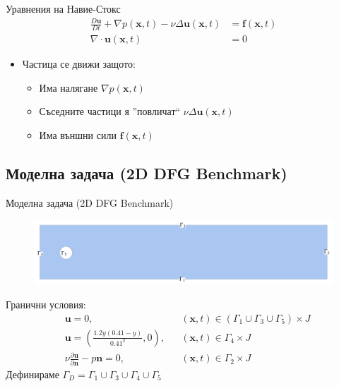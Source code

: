 \documentclass{beamer}
\newcommand{\vecf}[1]{\boldsymbol{#1}}
\begin{document}
\begin{frame}{Уравнения на Навие-Стокс}
\begin{align*}
  \frac{D\boldsymbol{u}}{Dt} + \nabla p(\vecf{x}, t) - \nu\Delta\vecf{u}(\vecf{x}, t) &= \vecf{f}(\vecf{x}, t)\\
  \nabla \cdot \vecf{u}(\vecf{x}, t) &= 0
\end{align*}
	\begin{itemize}[<+->]
		\item Частица се движи защото:
			\begin{itemize}
				\item Има налягане $\nabla p(\vecf{x}, t)$
				\item Съседните частици я ''повличат`` $\nu\Delta\vecf{u}(\vecf{x}, t)$
				\item Има външни сили $\vecf{f}(\vecf{x}, t)$
			\end{itemize}
	\end{itemize}
\end{frame}

\subsection{Моделна задача (2D DFG Benchmark)}
\begin{frame}{Моделна задача (2D DFG Benchmark)}
\begin{figure}[H]
  \centering
  \includegraphics[width=\textwidth]{../../Figures/02_model_problem/2D_DFG_Benchmark.pdf}
\end{figure}
Гранични условия:
\begin{align*}
  &\vecf{u} = 0, &&\left(\vecf{x}, t\right) \in \left(\Gamma_1 \cup \Gamma_3 \cup \Gamma_5\right) \times J \\
  &\vecf{u} = \left(\frac{1.2y\left(0.41 - y\right)}{0.41^2}, 0\right), &&\left(\vecf{x}, t\right) \in \Gamma_4 \times J \\
  &\nu\frac{\partial\vecf{u}}{\partial\vecf{n}} - p\vecf{n} = 0, &&\left(\vecf{x}, t\right) \in \Gamma_2 \times J
\end{align*}
Дефинираме $\Gamma_D = \Gamma_1 \cup \Gamma_3 \cup \Gamma_4 \cup \Gamma_5$
\end{frame}
\end{document}
